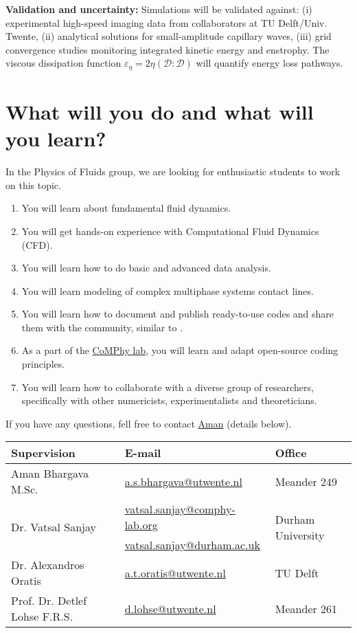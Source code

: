 \documentclass[a4paper,10pt]{article}
\begin{document}
\noindent \textbf{Validation and uncertainty:} Simulations will be validated against: (i) experimental high-speed imaging data from collaborators at TU Delft/Univ. Twente, (ii) analytical solutions for small-amplitude capillary waves, (iii) grid convergence studies monitoring integrated kinetic energy and enstrophy. The viscous dissipation function $\varepsilon_\eta = 2\eta\left(\boldsymbol{\mathcal{D}:\mathcal{D}}\right)$ will quantify energy loss pathways.

\section*{What will you do and what will you learn?}
In the Physics of Fluids group, we are looking for enthusiastic students to work on this topic.
\begin{enumerate}
\itemsep0em
\item You will learn about fundamental fluid dynamics.
\item You will get hands-on experience with Computational Fluid Dynamics (CFD).
\item You will learn how to do basic and advanced data analysis.
\item You will learn modeling of complex multiphase systems contact lines. 
\item You will learn how to document and publish ready-to-use codes and share them with the community, similar to \citet{basiliskVatsal, basiliskVatsalDropFilm, basiliskVatsalViscousBouncing}. 
\item As a part of the \href{https://comphy-lab.org}{CoMPhy lab}, you will learn and adapt open-source coding principles. 
\item You will learn how to collaborate with a diverse group of researchers, specifically with other numericists, experimentalists and theoreticians.
\end{enumerate}

If you have any questions, fell free to contact \href{mailto:a.s.bhargava@utwente.nl}{Aman} (details below).
\begin{center}
\begin{tabular}{|l|l|l|}
\hline \textbf{Supervision} & \textbf{E-mail} & \textbf{Office} \\
\hline Aman Bhargava M.Sc. & \href{mailto:a.s.bhargava@utwente.nl}{a.s.bhargava@utwente.nl} & Meander 249 \\
\hline \multirow{2}{*}{Dr. Vatsal Sanjay} & \href{mailto:vatsal.sanjay@comphy-lab.org}{vatsal.sanjay@comphy-lab.org} & \multirow{2}{*}{Durham University} \\
& \href{mailto:vatsal.sanjay@durham.ac.uk}{vatsal.sanjay@durham.ac.uk} & \\
\hline Dr. Alexandros Oratis   & \href{mailto:a.t.oratis@utwente.nl}{a.t.oratis@utwente.nl}& TU Delft \\
\hline Prof. Dr. Detlef Lohse F.R.S. & \href{mailto:d.lohse@utwente.nl}{d.lohse@utwente.nl} & Meander 261  \\
\hline
\end{tabular}
\end{center}

\printbibliography
\end{document}
